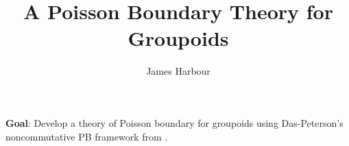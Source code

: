 \documentclass[12pt]{article}
\title{A Poisson Boundary Theory for Groupoids}
\author{James Harbour}
\begin{document}
\maketitle

\textbf{Goal}: Develop a theory of Poisson boundary for groupoids using Das-Peterson's noncommutative PB framework from \cite{dp:22}.






\newpage









\printbibliography
\end{document}
